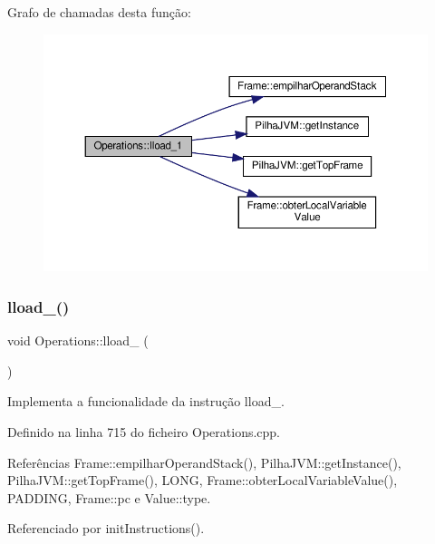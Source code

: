 Grafo de chamadas desta função\+:
\nopagebreak
\begin{figure}[H]
\begin{center}
\leavevmode
\includegraphics[width=350pt]{classOperations_a34e91f6520ca574abce6b2b30ce91948_cgraph}
\end{center}
\end{figure}
\mbox{\label{classOperations_aa59772a5ed2bd59de3d54c635f294e93}} 
\subsubsection{\texorpdfstring{lload\+\_()}{lload\_2()}}
{\footnotesize\ttfamily void Operations\+::lload\+\_ (\begin{DoxyParamCaption}{ }\end{DoxyParamCaption})\hspace{0.3cm}{\ttfamily [private]}}



Implementa a funcionalidade da instrução lload\+\_. 



Definido na linha 715 do ficheiro Operations.\+cpp.



Referências Frame\+::empilhar\+Operand\+Stack(), Pilha\+J\+V\+M\+::get\+Instance(), Pilha\+J\+V\+M\+::get\+Top\+Frame(), L\+O\+NG, Frame\+::obter\+Local\+Variable\+Value(), P\+A\+D\+D\+I\+NG, Frame\+::pc e Value\+::type.



Referenciado por init\+Instructions().

